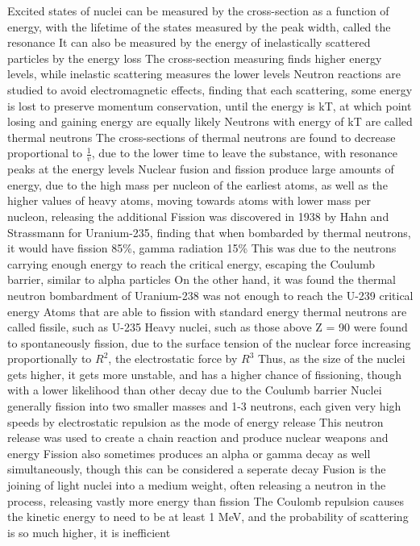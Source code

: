 \documentclass[11 pt, twoside]{article}
\newenvironment{outline*}
{
	\begin{outline}[enumerate]
	}
	{\end{outline}
}
\begin{document}
\begin{outline*}
	\2 Excited states of nuclei can be measured by the cross-section as a function of energy, with the lifetime of the states measured by the peak width, called the resonance
		\3 It can also be measured by the energy of inelastically scattered particles by the energy loss
		\3 The cross-section measuring finds higher energy levels, while inelastic scattering measures the lower levels
	\2 Neutron reactions are studied to avoid electromagnetic effects, finding that each scattering, some energy is lost to preserve momentum conservation, until the energy is kT, at which point losing and gaining energy are equally likely
		\3 Neutrons with energy of kT are called thermal neutrons
		\3 The cross-sections of thermal neutrons are found to decrease proportional to $\frac{1}{v}$, due to the lower time to leave the substance, with resonance peaks at the energy levels
\1 Nuclear fusion and fission produce large amounts of energy, due to the high mass per nucleon of the earliest atoms, as well as the higher values of heavy atoms, moving towards atoms with lower mass per nucleon, releasing the additional
	\2 Fission was discovered in 1938 by Hahn and Strassmann for Uranium-235, finding that when bombarded by thermal neutrons, it would have fission 85\%, gamma radiation 15\%
		\3 This was due to the neutrons carrying enough energy to reach the critical energy, escaping the Coulumb barrier, similar to alpha particles
		\3 On the other hand, it was found the thermal neutron bombardment of Uranium-238 was not enough to reach the U-239 critical energy
			\4 Atoms that are able to fission with standard energy thermal neutrons are called fissile, such as U-235
		\3 Heavy nuclei, such as those above Z = 90 were found to spontaneously fission, due to the surface tension of the nuclear force increasing proportionally to $R^2$, the electrostatic force by $R^3$
			\4 Thus, as the size of the nuclei gets higher, it gets more unstable, and has a higher chance of fissioning, though with a lower likelihood than other decay due to the Coulumb barrier
		\3 Nuclei generally fission into two smaller masses and 1-3 neutrons, each given very high speeds by electrostatic repulsion as the mode of energy release
			\4 This neutron release was used to create a chain reaction and produce nuclear weapons and energy
		\3 Fission also sometimes produces an alpha or gamma decay as well simultaneously, though this can be considered a seperate decay
	\2 Fusion is the joining of light nuclei into a medium weight, often releasing a neutron in the process, releasing vastly more energy than fission
		\3 The Coulomb repulsion causes the kinetic energy to need to be at least 1 MeV, and the probability of scattering is so much higher, it is inefficient

\end{outline*}
\end{document}
